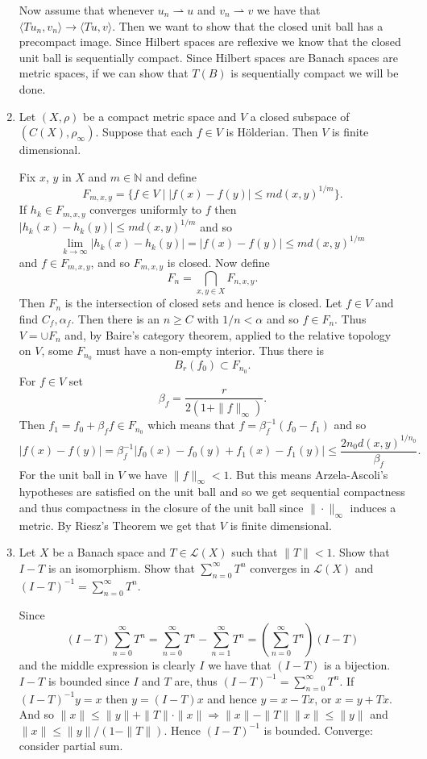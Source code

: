 \documentclass{article}
\newcommand{\weakly}{\rightharpoonup}
\begin{document}
\begin{enumerate}
Now assume that whenever $u_n \weakly u$ and $v_n \weakly v$ we have that $\langle T u_n, v_n \rangle \to \langle T u, v \rangle$. Then we want to show that the closed unit ball has a precompact image. Since Hilbert spaces are reflexive we know that the closed unit ball is sequentially compact. Since Hilbert spaces are Banach spaces are metric spaces, if we can show that $T(B)$ is sequentially compact we will be done.


\item Let $(X, \rho)$ be a compact metric space and $V$ a closed subspace of $(C(X), \rho_\infty)$. Suppose that each $f \in V$ is H\"olderian. Then $V$ is finite dimensional.

Fix $x$, $y$ in $X$ and $m \in \mathbb{N}$ and define $$F_{m,x,y} = \{ f \in V \mid |f(x) - f(y)| \leq m d(x, y)^{1/m} \}.$$ If $h_k \in F_{m, x, y}$ converges uniformly to $f$ then $|h_k(x) - h_k(y)| \leq m d(x, y)^{1/m}$ and so $$\lim_{k \to \infty} |h_k(x) - h_k(y)| = |f(x) - f(y)| \leq m d(x, y)^{1/m}$$ and $f \in F_{m, x, y}$, and so $F_{m, x, y}$ is closed. Now define $$F_n = \bigcap_{x, y \in X} F_{n, x, y}.$$ Then $F_n$ is the intersection of closed sets and hence is closed. Let $f \in V$ and find $C_f, \alpha_f$. Then there is an $n \geq C$ with $1/n < \alpha$ and so $f \in F_n$. Thus $V = \cup F_n$ and, by Baire's category theorem, applied to the relative topology on $V$, some $F_{n_0}$ must have a non-empty interior. Thus there is $$B_r(f_0) \subset F_{n_0}.$$ For $f \in V$ set $$\beta_f = \dfrac{r}{2(1 + \|f\|_\infty)}.$$ Then $f_1 = f_0 + \beta_f f \in F_{n_0}$ which means that $f = \beta_f^{-1} (f_0 - f_1)$ and so $$|f(x) - f(y)| = \beta_f^{-1}|f_0(x) - f_0(y) + f_1(x) - f_1(y)| \leq \dfrac{2 n_0 d(x, y)^{1/n_0}}{\beta_f}.$$ For the unit ball in $V$ we have $\|f\|_\infty < 1$. But this means Arzela-Ascoli's hypotheses are satisfied on the unit ball and so we get sequential compactness and thus compactness in the closure of the unit ball since $\|\cdot\|_\infty$ induces a metric. By Riesz's Theorem we get that $V$ is finite dimensional.


\item Let $X$ be a Banach space and $T \in \mathcal{L}(X)$ such that $\|T\| < 1$. Show that $I - T$ is an isomorphism. Show that $\sum_{n=0}^\infty T^n$ converges in $\mathcal{L}(X)$ and $(I - T)^{-1} = \sum_{n=0}^\infty T^n$.

Since $$(I - T) \sum_{n=0}^\infty T^n = \sum_{n=0}^\infty T^n - \sum_{n=1}^\infty T^n = \left(\sum_{n=0}^\infty T^n\right)(I - T)$$ and the middle expression is clearly $I$ we have that $(I - T)$ is a bijection. $I-T$ is bounded since $I$ and $T$ are, thus $(I - T)^{-1} = \sum_{n=0}^\infty T^n$. If $(I - T)^{-1} y = x$ then $y = (I - T)x$ and hence $y = x - Tx$, or $x = y + Tx$. And so $\|x\| \leq \|y\| + \|T\| \cdot \|x\| \Rightarrow \|x\| - \|T\| \|x\| \leq \|y\|$ and $\|x\| \leq \|y\|/(1 - \|T\|)$. Hence $(I - T)^{-1}$ is bounded. Converge: consider partial sum.



\end{enumerate}
\end{document}
